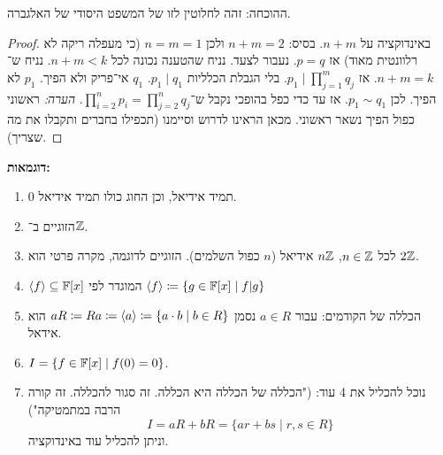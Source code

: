 \documentclass[name=רשימות אלגברה לינארית 2א]{../../../tex/classes/megasumPreamble}
\begin{document}
	ההוכחה: זהה לחלוטין לזו של המשפט היסודי של האלגברה. \begin{proof}
		באינדוקציה על $n+m$. בסיס: $n + m = 2$ ולכן $n = m = 1$ (כי מעפלה ריקה לא רלוונטית מאוד) אז $p = q$. נעבור לצעד. נניח שהטענה נכונה לכל $n + m < k$. נניח ש־$n + m = k$. אז $p_1 \mid \prod_{j = 1}^{m}q_j$. בלי הגבלת הכלליות $p_1 \mid q_1$. $q_1$ אי־פריק ולא הפיך. $p_1$ לא הפיך. לכן $p_1 \sim q_1$. אז עד כדי כפל בהופכי נקבל ש־$\prod_{i = 2}^{n} p_i = \prod_{j = 2}^{n} q_j$. \textit{הערה: }ראשוני כפול הפיך נשאר ראשוני. מכאן הראינו לדרוש וסיימנו (תכפילו בחברים ותקבלו את מה שצריך). 
	\end{proof}
	
	\textbf{דוגמאות: }\begin{enumerate}
		\item $0$ תמיד אידיאל, וכן החוג כולו תמיד אידיאל. 
		\item הזוגיים ב־$\mathbb{Z}$. 
		\item לכל $n \in \mathbb{Z}$, $n\mathbb{Z}$ אידיאל ($n$ כפול השלמים). הזוגיים לדוגמה, מקרה פרטי הוא $2\mathbb{Z}$. 
		\item $\langle f \rangle \subseteq \mathbb{F}[x]$ המוגדר לפי $\langle f \rangle \coloneqq \{g \in \mathbb{F}[x] \mid f|g\}$
		\item הכללה של הקודמים: עבור $a \in R$ נסמן $aR \coloneqq Ra\coloneqq\langle a \rangle \coloneqq \{a \cdot b \mid b \in R\}$ הוא אידאל. 
		\item $I = \{f \in \mathbb{F}[x] \mid f(0) = 0\}$. 
		\item נוכל להכליל את 4 עוד: ("הכללה של הכללה היא הכללה. זה סגור להכללה. זה קורה הרבה במתמטיקה")
		\[ I = aR + bR = \{ar + bs \mid r, s \in R\} \]
		וניתן להכליל עוד באינדוקציה. 
	\end{enumerate}
	
	
\end{document}
